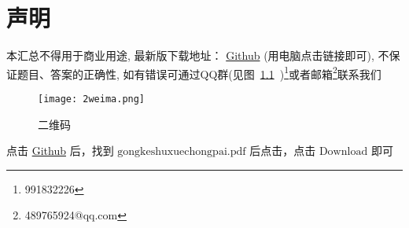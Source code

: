 \chapter{声明}
本汇总不得用于商业用途, 最新版下载地址： \href{https://github.com/sikouhjw/Mathematical-rearrangement}{Github} (用电脑点击链接即可), 不保证题目、答案的正确性, 如有错误可通过QQ群(见图~\ref{fig:1}~)\footnote{991832226}或者邮箱\footnote{489765924@qq.com}联系我们
\begin{figure}[htbp]
	\centering
	\texttt{[image: 2weima.png]}
	\caption{二维码}\label{fig:1}
\end{figure}

点击 \href{https://github.com/sikouhjw/Mathematical-rearrangement}{Github} 后，找到 $\mathrm{gongkeshuxuechongpai.pdf}$ 后点击，点击 $\mathrm{Download}$ 即可
